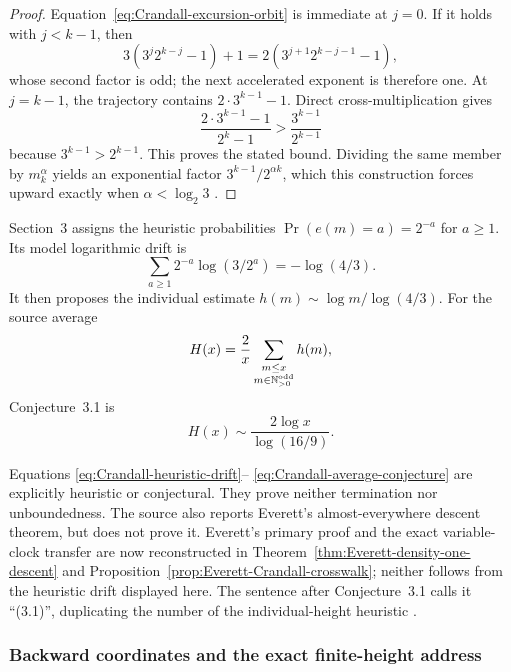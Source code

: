 \begin{proof}
Equation~\eqref{eq:Crandall-excursion-orbit} is immediate at $j=0$.  If it
holds with $j<k-1$, then
\[
 3(3^j2^{k-j}-1)+1
 =2(3^{j+1}2^{k-j-1}-1),
\]
whose second factor is odd; the next accelerated exponent is therefore one.
At $j=k-1$, the trajectory contains $2\cdot3^{k-1}-1$.  Direct
cross-multiplication gives
\[
 \frac{2\cdot3^{k-1}-1}{2^k-1}>
 \frac{3^{k-1}}{2^{k-1}}
\]
because $3^{k-1}>2^{k-1}$.  This proves the stated bound.  Dividing the same
member by $m_k^\alpha$ yields an exponential factor
$3^{k-1}/2^{\alpha k}$, which this construction forces upward exactly when
$\alpha<\log_2 3$ \cite[pp.~1282--1283, Thm.~2.2 and following paragraph]
{Crandall1978}.
\end{proof}

Section~3 assigns the heuristic probabilities
$\Pr(e(m)=a)=2^{-a}$ for $a\geq1$.  Its model logarithmic drift is
\begin{equation}
\label{eq:Crandall-heuristic-drift}
 \sum_{a\geq1}2^{-a}\log(3/2^a)=-\log(4/3).
\end{equation}
It then proposes the individual estimate
$h(m)\sim\log m/\log(4/3)$.  For the source average
\begin{equation}
\label{eq:Crandall-average-height}
 H(x)=\frac2x\sum_{\substack{m\leq x\\m\in\mathbb{N}_{>0}^{\mathrm{odd}}}}h(m),
\end{equation}
Conjecture~3.1 is
\begin{equation}
\label{eq:Crandall-average-conjecture}
 H(x)\sim\frac{2\log x}{\log(16/9)}.
\end{equation}

\begin{nonclaim}
\label{nonclaim:Crandall-random-walk}
Equations \eqref{eq:Crandall-heuristic-drift}--
\eqref{eq:Crandall-average-conjecture} are explicitly heuristic or
conjectural.  They prove neither termination nor unboundedness.  The source
also reports Everett's almost-everywhere descent theorem, but does not prove
it.  Everett's primary proof and the exact variable-clock transfer are now
reconstructed in Theorem~\ref{thm:Everett-density-one-descent} and
Proposition~\ref{prop:Everett-Crandall-crosswalk}; neither follows from the
heuristic drift displayed here.  The sentence after Conjecture~3.1 calls it
``(3.1)'', duplicating the number of the individual-height heuristic
\cite[pp.~1282--1284]{Crandall1978}.
\end{nonclaim}

\subsubsection{Backward coordinates and the exact finite-height address}

